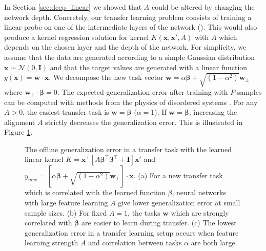 \documentclass{article} %
\def\x{\bm x}
\begin{document}
\begin{appendix}
In Section \ref{sec:deep_linear} we showed that $A$ could be altered by changing the network depth. Concretely, our transfer learning problem consists of training a linear probe on one of the intermediate layers of the network (\cite{alain2016understanding, cohen2020separability}). This would also produce a kernel regression solution for kernel $K(\x,\x',A)$ with $A$ which depends on the chosen layer and the depth of the network. For simplicity, we  assume that the data are generated according to a simple Gaussian distribution $\x \sim \mathcal{N}(0,\bm I)$ and that the target values are generated with a linear function $y(\x) = \bm w \cdot \x$. We  decompose the new task vector $\bm w = \alpha \bm\beta + \sqrt{(1-\alpha^2)} \bm w_{\perp}$ where $\bm w_{\perp} \cdot \bm \beta = 0$. The expected generalization error after training with $P$ samples can be computed with methods from the physics of disordered systems \citep{bordelon_icml_learning_curve, Canatar2021SpectralBA, loureiro_lenka_feature_maps}.   For any $A>0$, the easiest transfer task is $\bm w = \bm\beta$ ($\alpha = 1$). If $\bm w = \bm \beta$, increasing the alignment $A$ strictly decreases the generalization error. This is illustrated in Figure \ref{fig:generalization}.
    

\begin{figure}[h]
    \centering
    \caption{The offline generalization error in a transfer task with the learned linear kernel $K = \x^\top \left[ A \bm \beta^\top \bm \beta^\top + \bm I \right] \x'$ and $y_{new} = \left[ \alpha \bm\beta + \sqrt{(1-\alpha^2)} \bm w_{\perp} \right] \cdot \x$. (a) For a new transfer task which is correlated with the learned function $\beta$, neural networks with large feature learning $A$ give lower generalization error at small sample sizes. (b) For fixed $A=1$, the tasks $\bm w$ which are strongly correlated with $\bm\beta$ are easier to learn during transfer. (c) The lowest generalization error in a transfer learning setup occurs when feature learning strength $A$ and correlation between tasks $\alpha$ are both large.}
    \label{fig:generalization}
\end{figure}



\end{appendix}
\end{document}
